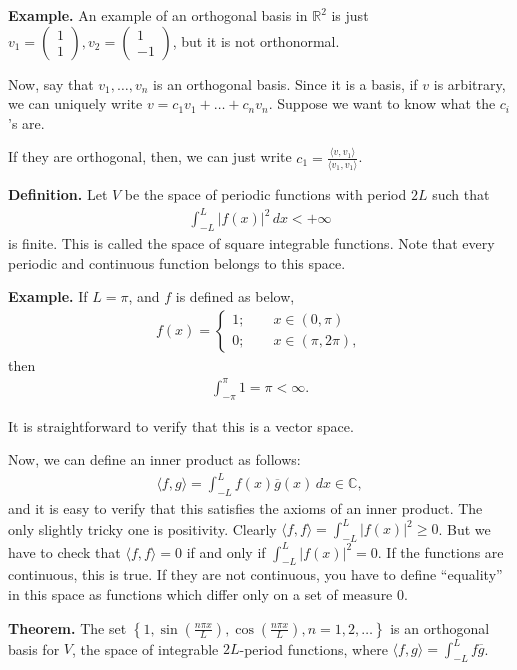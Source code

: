 \documentclass{article}
\newcommand{\RR}{\mathbb{R}}
\newcommand{\CC}{\mathbb{C}}
\newcommand{\ol}{\overline}
\newcommand{\mat}[1]{\begin{pmatrix}#1\end{pmatrix}}
\begin{document}
{\bf Example.} An example of an orthogonal basis in $\RR^2$ is just $v_1 = \mat{1 \\ 1}, v_2 = \mat{1 \\ -1}$, but it is not orthonormal.

Now, say that $v_1, \dots, v_n$ is an orthogonal basis.  Since it is a basis, if $v$ is arbitrary, we can uniquely write $v = c_1 v_1 + \dots + c_n v_n$.  Suppose we want to know what the $c_i$'s are.  

If they are orthogonal, then, we can just write $c_1 = \frac{\langle v, v_1\rangle}{\langle v_1, v_1\rangle}$.

{\bf Definition.} Let $V$ be the space of periodic functions with period $2L$ such that
\begin{align*}
  \int_{-L}^{L} |f(x)|^2 \, dx < + \infty
\end{align*}
is finite.  This is called the space of square integrable functions.  Note that every periodic and continuous function belongs to this space.

{\bf Example.} If $L = \pi$, and $f$ is defined as below,
\begin{align*}
  f(x) = 
  \begin{cases}
    1; \qquad x \in (0, \pi) \\
    0; \qquad x \in (\pi, 2 \pi),
  \end{cases}
\end{align*}
then
\begin{align*}
  \int_{-\pi}^{\pi} 1 = \pi < \infty.
\end{align*}

It is straightforward to verify that this is a vector space.

Now, we can define an inner product as follows:
\begin{align*}
  \langle f, g\rangle = \int_{-L}^{L} f(x) \ol{g}(x) \, dx \in \CC,
\end{align*}
and it is easy to verify that this satisfies the axioms of an inner product.  The only slightly tricky one is positivity.  Clearly  $\langle f, f\rangle = \int_{-L}^{L} |f(x)|^2 \geq 0$.  But we have to check that $\langle f, f \rangle = 0$ if and only if $\int_{-L}^{L} |f(x)|^2 = 0$.  If the functions are continuous, this is true.  If they are not continuous, you have to define ``equality'' in this space as functions which differ only on a set of measure 0.

{\bf Theorem.} The set $\left\{ 1, \sin\left( \frac{n \pi x}{L} \right), \cos \left( \frac{n \pi x}{ L} \right), n = 1, 2, \dots \right\}$ is an orthogonal basis for $V$, the space of integrable $2L$-period functions, where $\langle f, g\rangle = \int_{-L}^{L} f \ol{g}$.
\end{document}
